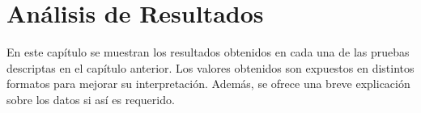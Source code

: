 \chapter{Análisis de Resultados}
\label{chap:analisis}

En este capítulo se muestran los resultados obtenidos en cada una de las pruebas
descriptas en el capítulo anterior. Los valores obtenidos son expuestos en
distintos formatos para mejorar su interpretación. Además, se ofrece una breve
explicación sobre los datos si así es requerido.






